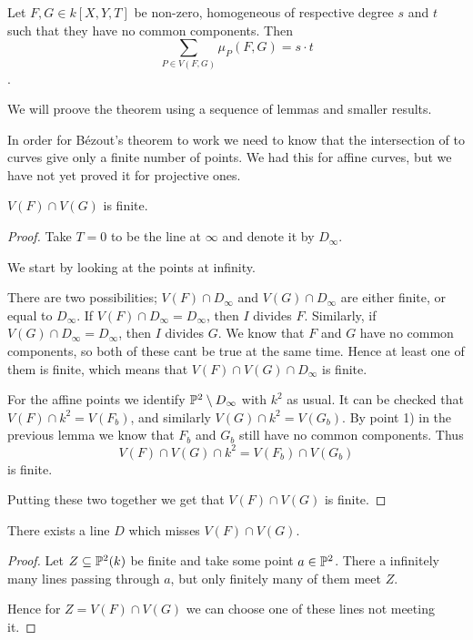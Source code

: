 \begin{theorem}
Let $F, G\in k[X, Y, T]$ be non-zero, homogeneous of respective degree $s$ and $t$ such that they have no common components. Then 
\begin{equation*}
    \sum_{P\in V(F, G)}\mu_P(F, G) = s\cdot t
\end{equation*}.
\end{theorem}

We will proove the theorem using a sequence of lemmas and smaller results. 

In order for Bézout's theorem to work we need to know that the intersection of to curves give only a finite number of points. We had this for affine curves, but we have not yet proved it for projective ones. 

\begin{lemma}
$V(F)\cap V(G)$ is finite. 
\end{lemma}
\begin{proof}
Take $T=0$ to be the line at $\infty$ and denote it by $D_\infty$. 

We start by looking at the points at infinity. 

There are two possibilities; $V(F)\cap D_\infty$ and $V(G)\cap D_\infty$ are either finite, or equal to $D_\infty$. If $V(F)\cap D_\infty = D_\infty$, then $I$ divides $F$. Similarly, if $V(G)\cap D_\infty = D_\infty$, then $I$ divides $G$. We know that $F$ and $G$ have no common components, so both of these cant be true at the same time. Hence at least one of them is finite, which means that $V(F)\cap V(G)\cap D_\infty$ is finite. 

For the affine points we identify $\P^2\setminus D_\infty$ with $k^2$ as usual. It can be checked that $V(F)\cap k^2 = V(F_b)$, and similarly $V(G)\cap k^2 = V(G_b)$. By point 1) in the previous lemma we know that $F_b$ and $G_b$ still have no common components. Thus 
\begin{equation*}
    V(F)\cap V(G) \cap k^2 = V(F_b)\cap V(G_b)
\end{equation*}
is finite.

Putting these two together we get that $V(F)\cap V(G)$ is finite. 
\end{proof}

\begin{lemma}
There exists a line $D$ which misses $V(F)\cap V(G)$. 
\end{lemma}
\begin{proof}
Let $Z\subseteq \P^2(k)$ be finite and take some point $a\in \P^2$. There a infinitely many lines passing through $a$, but only finitely many of them meet $Z$. 

Hence for $Z=V(F)\cap V(G)$ we can choose one of these lines not meeting it. 
\end{proof}


